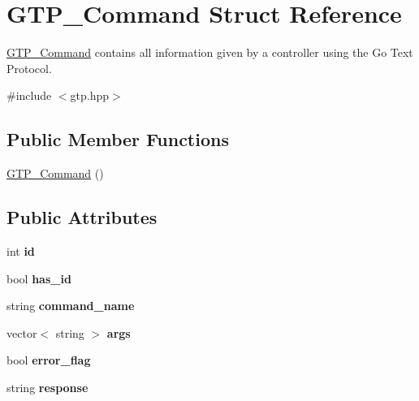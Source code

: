 \hypertarget{struct_g_t_p___command}{\section{G\-T\-P\-\_\-\-Command Struct Reference}
\label{struct_g_t_p___command}
}


\hyperlink{struct_g_t_p___command}{G\-T\-P\-\_\-\-Command} contains all information given by a controller using the Go Text Protocol.  




{\ttfamily \#include $<$gtp.\-hpp$>$}

\subsection*{Public Member Functions}
\begin{DoxyCompactItemize}
\item 
\hyperlink{struct_g_t_p___command_a3a87e68261398b164d7ead50d4d63e96}{G\-T\-P\-\_\-\-Command} ()
\end{DoxyCompactItemize}
\subsection*{Public Attributes}
\begin{DoxyCompactItemize}
\item 
\hypertarget{struct_g_t_p___command_a5410c5b4d614d21b4e910cf8ce50b778}{int {\bfseries id}}\label{struct_g_t_p___command_a5410c5b4d614d21b4e910cf8ce50b778}

\item 
\hypertarget{struct_g_t_p___command_ad7d24217f992437900c4b4d59a4edb6d}{bool {\bfseries has\-\_\-id}}\label{struct_g_t_p___command_ad7d24217f992437900c4b4d59a4edb6d}

\item 
\hypertarget{struct_g_t_p___command_abc8973d71330adb1deb20c20c6233a63}{string {\bfseries command\-\_\-name}}\label{struct_g_t_p___command_abc8973d71330adb1deb20c20c6233a63}

\item 
\hypertarget{struct_g_t_p___command_a7099195267ede90e7fbc8c285a54d9d4}{vector$<$ string $>$ {\bfseries args}}\label{struct_g_t_p___command_a7099195267ede90e7fbc8c285a54d9d4}

\item 
\hypertarget{struct_g_t_p___command_a77e56c8aca4528de8c4f9ead5a4a9383}{bool {\bfseries error\-\_\-flag}}\label{struct_g_t_p___command_a77e56c8aca4528de8c4f9ead5a4a9383}

\item 
\hypertarget{struct_g_t_p___command_a9a69b54f08c7a0f425767652902463bb}{string {\bfseries response}}\label{struct_g_t_p___command_a9a69b54f08c7a0f425767652902463bb}

\end{DoxyCompactItemize}


